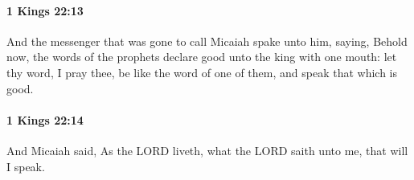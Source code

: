 		\paragraph{1 Kings 22:13} %
			\label{1KINGS-22-13}

			And the messenger that was gone to call Micaiah spake unto him, saying, Behold now, the words of the prophets declare good unto the king with one mouth: let thy word, I pray thee, be like the word of one of them, and speak that which is good.


		\paragraph{1 Kings 22:14} %
			\label{1KINGS-22-14}

			And Micaiah said, As the LORD liveth, what the LORD saith unto me, that will I speak.


